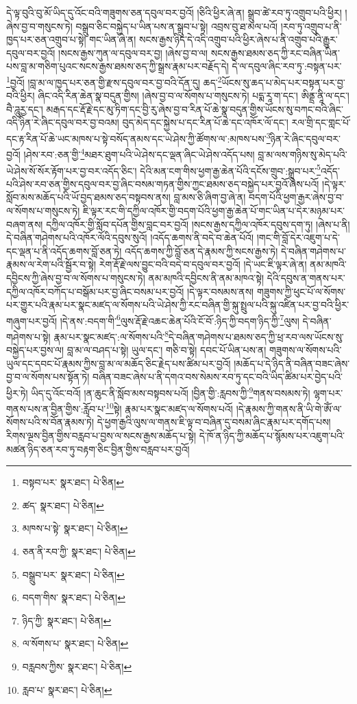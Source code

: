 དེ་ལྟ་བུའི་བུ་མོ་ཡིད་དུ་འོང་བའི་གཟུགས་ཅན་དབུལ་བར་བྱའོ། །ཅིའི་ཕྱིར་ཞེ་ན། སྒྲུབ་ཚེ་རབ་ཏུ་འགྲུབ་པའི་ཕྱིར། །ཞེས་བྱ་བ་གསུངས་ཏེ། བསྒྲུབ་ཅིང་བསྐྱེད་པ་ཡིན་པས་ན་སྒྲུབ་པ་སྟེ། འབྲས་བུ་ཐ་མལ་པའོ། །རབ་ཏུ་འགྲུབ་པ་ནི་ཁྱད་པར་ཅན་འགྲུབ་པ་སྟེ། གང་ཡིན་ཞེ་ན། སངས་རྒྱས་ཉིད་དེ་འདི་འགྲུབ་པའི་ཕྱིར་ཞེས་པ་ནི་འགྲུབ་པའི་རྒྱུར་དབུལ་བར་བྱའོ། །སངས་རྒྱས་ཀུན་ལ་དབུལ་བར་བྱ། །ཞེས་བྱ་བ་ལ། སངས་རྒྱས་ཐམས་ཅད་ཀྱི་རང་བཞིན་ཡིན་པས་བླ་མ་གཅིག་པུའང་སངས་རྒྱས་ཐམས་ཅད་ཀྱི་སྒྲས་རྣམ་པར་བརྗོད་དེ། དེ་ལ་དབུལ་ཞིང་རབ་ཏུ་:བསྟན་པར་\footnote{བསྟབ་པར་  སྣར་ཐང་།  པེ་ཅིན། }བྱའོ། །བླ་མ་ལ་ཁྱད་པར་ཅན་གྱི་རྫས་དབུལ་བར་བྱ་བའི་དོན་དུ། ཆད་\footnote{ཚད་  སྣར་ཐང་།  པེ་ཅིན། }ཡོངས་སུ་ཆད་པ་མེད་པར་བསྟན་པར་བྱ་བའི་ཕྱིར། ཞིང་འདི་རིན་ཆེན་སྣ་བདུན་གྱིས། །ཞེས་བྱ་བ་ལ་སོགས་པ་གསུངས་ཏེ། པདྨ་རཱ་ག་དང་། ཨིནྡྲ་ནཱི་ལ་དང་། བཻ་ཌཱུརྱ་དང་། མརྒད་དང་རྡོ་རྗེ་དང་མུ་ཏིག་དང་བྱི་རུ་ཞེས་བྱ་བ་རིན་པོ་ཆེ་སྣ་བདུན་གྱིས་ཡོངས་སུ་བཀང་བའི་ཞིང་འདི་ཉིན་རེ་ཞིང་དབུལ་བར་བྱ་བའམ། བུད་མེད་དང་སྐྱེས་པ་དང་རིན་པོ་ཆེ་དང་འཁོར་ལོ་དང་། རལ་གྲི་དང་གླང་པོ་དང་རྟ་རིན་པོ་ཆེ་ཡང་མཁས་པ་སྟེ་བསོད་ནམས་དང་ཡེ་ཤེས་ཀྱི་ཚོགས་ལ་:མཁས་པས་\footnote{མཁས་པ་སྟེ་  སྣར་ཐང་།  པེ་ཅིན། }ཉིན་རེ་ཞིང་དབུལ་བར་བྱའོ། །ཤེས་རབ་:ཅན་གྱི་\footnote{ཅན་ནི་རབ་ཀྱི་  སྣར་ཐང་།  པེ་ཅིན། }མཐར་ཐུག་པའི་ཡེ་ཤེས་དང་ལྡན་ཞིང་ཡེ་ཤེས་འདོད་པས། བླ་མ་ལས་གཉིས་སུ་མེད་པའི་ཡེ་ཤེས་སོ་སོར་རྟོག་པར་བྱ་བར་འདོད་ཅིང་། དེའི་མན་ངག་གིས་ཕྱག་རྒྱ་ཆེན་པོའི་དངོས་གྲུབ་:སྒྲུབ་པར་\footnote{བསྒྲུབ་པར་  སྣར་ཐང་།  པེ་ཅིན། }འདོད་པའི་ཤེས་རབ་ཅན་གྱིས་དབུལ་བར་བྱ་ཞིང་བསམ་གཏན་གྱིས་ཀྱང་ཐམས་ཅད་བསྐྱེད་པར་བྱའོ་ཞེས་པའོ། །དེ་ལྟར་སློབ་མས་མཆོད་པའི་ཡོ་བྱད་ཐམས་ཅད་བསྟབས་ནས། བླ་མས་ཅི་ཞིག་བྱ་ཞེ་ན། བདག་པོའི་ཕྱག་རྒྱར་ཞེས་བྱ་བ་ལ་སོགས་པ་གསུངས་ཏེ། ཇི་ལྟར་རང་གི་དཀྱིལ་འཁོར་གྱི་བདག་པོའི་ཕྱག་རྒྱ་ཆེན་པོ་གང་ཡིན་པ་དེར་མཉམ་པར་བཞག་ནས། དཀྱིལ་འཁོར་གྱི་སློབ་དཔོན་གྱིས་བླང་བར་བྱའོ། །སངས་རྒྱས་དཀྱིལ་འཁོར་དབུས་དག་ཏུ། །ཞེས་པ་ནི། དེ་བཞིན་གཤེགས་པའི་འཁོར་ལོའི་དབུས་སུའོ། །འདོད་ཆགས་ནི་བདེ་བ་ཆེན་པོའོ། །གང་གི་བློ་དེར་འཇུག་པ་དེ་དང་ལྡན་པ་ནི་འདོད་ཆགས་བློ་ཅན་ཏེ། འདོད་ཆགས་ཀྱི་བློ་ཅན་དེ་རྣམས་ཀྱི་སངས་རྒྱས་ཏེ། དེ་བཞིན་གཤེགས་པ་རྣམས་ལ་རེག་པའི་སྦྱོར་བ་སྟེ། རེག་རྡོ་རྗེ་ལས་བྱུང་བའི་བདེ་བ་དབུལ་བར་བྱའོ། །དེ་ཡང་ཇི་ལྟར་ཞེ་ན། ནམ་མཁའི་དབྱིངས་ཀྱི་ཞེས་བྱ་བ་ལ་སོགས་པ་གསུངས་ཏེ། ནམ་མཁའི་དབྱིངས་ནི་ནམ་མཁའ་སྟེ། དེའི་དབུས་ན་གནས་པར་དཀྱིལ་འཁོར་བཀོད་པ་བསྒོམ་པར་བྱ་ཞིང་བསམ་པར་བྱའོ། །དེ་ལྟར་བསམས་ནས། གཟུགས་ཀྱི་ཕུང་པོ་ལ་སོགས་པར་གྱུར་པའི་རྣམ་པར་སྣང་མཛད་ལ་སོགས་པའི་ཡེ་ཤེས་ཀྱི་རང་བཞིན་གྱི་སྐུ་སྤྲུལ་པའི་སྐུ་འཛིན་པར་བྱ་བའི་ཕྱིར་གཞུག་པར་བྱའོ། །དེ་ནས་:བདག་གི་\footnote{བདག་གིས་  སྣར་ཐང་།  པེ་ཅིན། }ལུས་རྡོ་རྗེ་འཆང་ཆེན་པོའི་ངོ་བོ་:ཉིད་ཀྱི་བདག་ཉིད་ཀྱི་\footnote{ཉིད་ཀྱི་  སྣར་ཐང་།  པེ་ཅིན། }ལུས། དེ་བཞིན་གཤེགས་པ་སྟེ། རྣམ་པར་སྣང་མཛད་:ལ་སོགས་པའི་\footnote{ལ་སོགས་པ་  སྣར་ཐང་།  པེ་ཅིན། }དེ་བཞིན་གཤེགས་པ་ཐམས་ཅད་ཀྱི་ཕྲ་རབ་ལས་ཡོངས་སུ་བསྐྱེད་པར་བྱས་ལ། བླ་མ་ལ་བཤད་པ་སྟེ། ཡུལ་དང་། གཅི་བ་སྟེ། དབང་པོ་ཡིན་པས་ན། གཟུགས་ལ་སོགས་པའི་ཡུལ་དང་དབང་པོ་རྣམས་ཀྱིས་བླ་མ་ལ་མཆོད་ཅིང་རྗེད་པས་ཚིམ་པར་བྱའོ། །མཆོད་པ་དེ་ཉིད་ནི་བཞིན་བཟང་ཞེས་བྱ་བ་ལ་སོགས་པས་སྟོན་ཏེ། བཞིན་བཟང་ཞེས་པ་ནི་དགའ་བས་སེམས་རབ་ཏུ་དང་བའི་ཡིད་ཚིམ་པར་བྱེད་པའི་ཕྱིར་ཏེ། ཡིད་དུ་འོང་བའོ། །ན་ཆུང་ནི་སློབ་མས་བསྟབས་པའོ། །བྱིན་གྱི་:རླབས་ཀྱི་\footnote{བརླབས་ཀྱིས་  སྣར་ཐང་།  པེ་ཅིན། }གནས་བསམས་ཏེ། ལྷག་པར་གནས་པས་ན་བྱིན་གྱིས་:རློབ་པ་\footnote{རླབ་པ་  སྣར་ཐང་།  པེ་ཅིན། }སྟེ། རྣམ་པར་སྣང་མཛད་ལ་སོགས་པའོ། །དེ་རྣམས་ཀྱི་གནས་ནི་ཡི་གེ་ཨོཾ་ལ་སོགས་པའི་ས་བོན་རྣམས་ཏེ། དེ་ཕྱག་རྒྱའི་ལུས་ལ་གནས་ཇི་ལྟ་བ་བཞིན་དུ་བསམ་ཞིང་རྣམ་པར་དགོད་པས། རིགས་ལྔས་བྱིན་གྱིས་བརླབ་པ་བྱས་ལ་སངས་རྒྱས་མཆོད་པ་སྟེ། དེ་ཁོ་ན་ཉིད་ཀྱི་མཆོད་པ་སྙོམས་པར་འཇུག་པའི་མཚན་ཉིད་ཅན་རབ་ཏུ་བརྟག་ཅིང་བྱིན་གྱིས་བརླབ་པར་བྱའོ། 